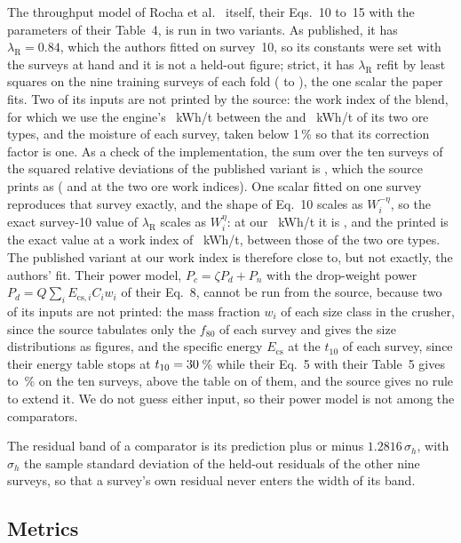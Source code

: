 \documentclass[journal]{IEEEtran}
\newcommand{\pct}{\,\%}
\begin{document}
The throughput model of Rocha et al.~\cite{rocha} itself, their Eqs.~10 to~15 with the parameters of their Table~4, is run
in two variants. As published, it has $\lambda_{\mathrm R}=0.84$, which the authors fitted on survey~10, so its constants
were set with the surveys at hand and it is not a held-out figure; strict, it has $\lambda_{\mathrm R}$ refit by least squares
on the nine training surveys of each fold (\rochaLamMin{} to \rochaLamMax), the one scalar the paper fits. Two of its inputs
are not printed by the source: the work index of the blend, for which we use the engine's \rochaWi~kWh/t between the
\rochaWiLo{} and \rochaWiHi~kWh/t of its two ore types, and the moisture of each survey, taken below 1\pct{} so that its
correction factor is one. As a check of the implementation, the sum over the ten surveys of the squared relative
deviations of the published variant is \rochaSsq, which the source prints as \rochaSsqPrinted{} (\rochaSsqLo{} and
\rochaSsqHi{} at the two ore work indices). One scalar fitted on one survey reproduces that survey exactly, and the shape of
Eq.~10 scales as $W_i^{-\eta}$, so the exact survey-10 value of $\lambda_{\mathrm R}$ scales as $W_i^{\eta}$: at our
\rochaWi~kWh/t it is \rochaLamTen, and the printed \rochaLamPrinted{} is the exact value at a work index of \rochaWiTen~kWh/t, between those
of the two ore types. The published variant at our work index is therefore close to, but not exactly, the authors' fit. Their power model, $P_c=\zeta P_d+P_n$ with the drop-weight power
$P_d=Q\sum_iE_{\mathrm{cs},i}C_iw_i$ of their Eq.~8, cannot be run from the source, because two of its inputs are not
printed: the mass fraction $w_i$ of each size class in the crusher, since the source tabulates only the $f_{80}$ of each
survey and gives the size distributions as figures, and the specific energy $E_{\mathrm{cs}}$ at the $t_{10}$ of each
survey, since their energy table stops at $t_{10}=30$\pct{} while their Eq.~5 with their Table~5 gives
\rochaTtenMin{} to \rochaTtenMax\pct{} on the ten surveys, above the table on \rochaTtenAbove{} of them, and the source
gives no rule to extend it. We do not guess either input, so their power model is not among the comparators.

The residual band of a
comparator is its prediction plus or minus $1.2816\,\sigma_h$, with $\sigma_h$ the sample standard deviation of the
held-out residuals of the other nine surveys, so that a survey's own residual never enters the width of its band.

\subsection{Metrics}
\end{document}
